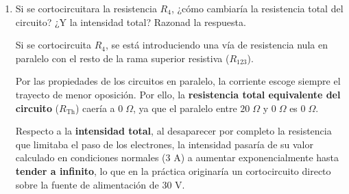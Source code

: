 \documentclass[11pt, a4paper]{article}
\newenvironment{problem}[1][Cuestión]{
	\vspace{0.5cm}
	\noindent{\Large\bfseries #1} \par\vspace{0.5cm}
}{
	\vspace{0.5cm}
}
\begin{document}
\begin{problem}[Cuestión 4]
\begin{enumerate}[label=\alph*)]
			\item Si se cortocircuitara la resistencia $R_4$, ¿cómo cambiaría la resistencia total del circuito? ¿Y la intensidad total? Razonad la respuesta.

				{ \color{blue} 
					Si se cortocircuita $R_4$, se está introduciendo una vía de resistencia nula en paralelo con el resto de la rama superior resistiva ($R_{123}$).

					Por las propiedades de los circuitos en paralelo, la corriente escoge siempre el trayecto de menor oposición. Por ello, la \textbf{resistencia total equivalente del circuito} ($R_{\text{Th}}$) caería a \textbf{$0 \; \Omega$}, ya que el paralelo entre $20 \; \Omega$ y $0 \; \Omega$ es $0 \; \Omega$.

					Respecto a la \textbf{intensidad total}, al desaparecer por completo la resistencia que limitaba el paso de los electrones, la intensidad pasaría de su valor calculado en condiciones normales ($3 \text{ A}$) a aumentar exponencialmente hasta \textbf{tender a infinito}, lo que en la práctica originaría un cortocircuito directo sobre la fuente de alimentación de 30 V.
				}
		\end{enumerate}
	\end{problem}
\end{document}
